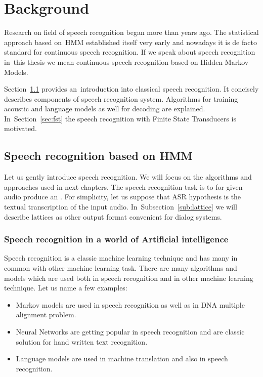 \chapter{Background}
\label{cha:background}

% 
% 

Research on field of speech recognition began more than  years ago. The statistical approach based 
on~\ac{HMM} established itself very early and nowadays it is de facto standard for continuous speech recognition. 
If we speak about speech recognition in~this thesis we mean continuous speech recognition based on Hidden Markov Models. 

Section~\ref{sec:general_introduction} provides an~introduction into classical speech recognition. 
It concisely describes components of speech recognition system. Algorithms for training acoustic and language models 
as well for decoding are explained. In~Section~\ref{sec:fst} the speech recognition with Finite State Transducers 
is motivated.

\section{Speech recognition based on \ac{HMM}} 
\label{sec:general_introduction}
Let us gently introduce speech recognition. We will focus on the algorithms and approaches used in next chapters.
The speech recognition task is to for given audio produce an .
For simplicity, let us suppose that ASR hypothesis is the textual transcription of the input audio. 
In~Subsection~\ref{sub:lattice} we will describe lattices as other output format convenient for dialog systems.

\subsection*{Speech recognition in a world of Artificial intelligence}
\label{sub:intro_ml}
Speech recognition is a classic machine learning technique and has many in common with other machine learning task. 
There are many algorithms and models which are used both in speech recognition and in other machine learning technique.
Let us name a few examples:
\begin{itemize}
    \item Markov models are used in speech recognition as well as in \ac{DNA} multiple alignment problem.
    \item Neural Networks are getting popular in speech recognition and are classic solution for hand written text recognition.
    \item Language models are used in machine translation and also in speech recognition. 
\end{itemize}

